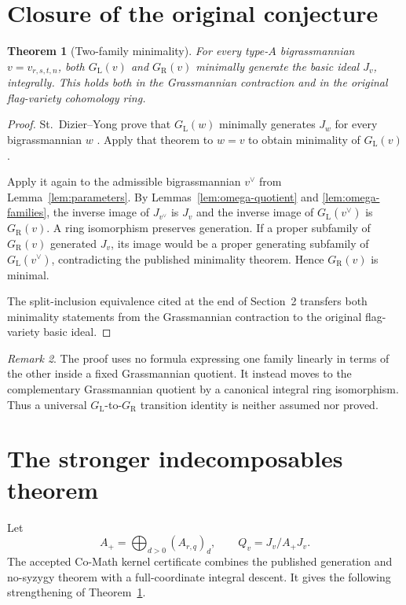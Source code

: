 \documentclass[11pt]{amsart}
\newtheorem{theorem}{Theorem}[section]
\theoremstyle{definition}
\theoremstyle{remark}
\newtheorem{remark}[theorem]{Remark}
\newcommand{\GL}{G_{\mathrm L}}
\newcommand{\GR}{G_{\mathrm R}}
\begin{document}
\section{Closure of the original conjecture}

\begin{theorem}[Two-family minimality]\label{thm:minimality}
For every type-$A$ bigrassmannian $v=v_{r,s,t,n}$, both $\GL(v)$ and $\GR(v)$
minimally generate the basic ideal $J_v$, integrally.  This holds both in the
Grassmannian contraction and in the original flag-variety cohomology ring.
\end{theorem}

\begin{proof}
St.~Dizier--Yong prove that $\GL(w)$ minimally generates $J_w$ for every
bigrassmannian $w$ \cite[Theorem~1.2 and its concluding corollary]{SDY}.
Apply that theorem to $w=v$ to obtain minimality of $\GL(v)$.

Apply it again to the admissible bigrassmannian $v^\vee$ from
Lemma~\ref{lem:parameters}.  By Lemmas~\ref{lem:omega-quotient} and
\ref{lem:omega-families}, the inverse image of $J_{v^\vee}$ is $J_v$ and the
inverse image of $\GL(v^\vee)$ is $\GR(v)$.  A ring isomorphism preserves
generation.  If a proper subfamily of $\GR(v)$ generated $J_v$, its image
would be a proper generating subfamily of $\GL(v^\vee)$, contradicting the
published minimality theorem.  Hence $\GR(v)$ is minimal.

The split-inclusion equivalence cited at the end of Section~2 transfers both
minimality statements from the Grassmannian contraction to the original
flag-variety basic ideal.
\end{proof}

\begin{remark}
The proof uses no formula expressing one family linearly in terms of the
other inside a fixed Grassmannian quotient.  It instead moves to the
complementary Grassmannian quotient by a canonical integral ring isomorphism.
Thus a universal $\GL$-to-$\GR$ transition identity is neither assumed nor
proved.
\end{remark}

\section{The stronger indecomposables theorem}

Let
\[
  A_+=\bigoplus_{d>0}(A_{r,q})_d,
  \qquad Q_v=J_v/A_+J_v.
\]
The accepted Co-Math kernel certificate combines the published generation and
no-syzygy theorem with a full-coordinate integral descent.  It gives the
following strengthening of Theorem~\ref{thm:minimality}.
\end{document}

